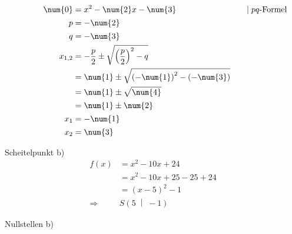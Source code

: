 \begin{exercise}
\begin{minipage}[t]{0.49\linewidth}
        \newcommand{\domod}[1]{\quad&|#1}%
        \begin{alignat*}{3}
          \noeq
          &
          \num{0}&=x^{2}-\num{2}x-\num{3}
          &
          \domod{\;\text{$pq$-Formel}}
          \\
          \noeq
          &
          p&=-\num{2}
          &
          \nomod
          \\
          \noeq
          &
          q&=-\num{3}
          &
          \nomod
          \\
          \noeq
          &
          x_{1,2}&=-\frac{p}{2}\pm\sqrt{\left(\frac{p}{2}\right)^2-q}
          &
          \nomod
          \\
          \noeq
          &
          &=\num{1}\pm\sqrt{\left(-\num{1}\right)^2-\left(-\num{3}\right)}
          &
          \nomod
          \\
          \noeq
          &
          &=\num{1}\pm\sqrt{\num{4}}
          &
          \nomod
          \\
          \noeq
          &
          &=\num{1}\pm\num{2}
          &
          \nomod
          \\
          \noeq
          &
          x_1&=-\num{1}
          &
          \nomod
          \\
          \noeq
          &
          x_2&=\num{3}
          &
          \nomod
        \end{alignat*}
      \endgroup
    \end{minipage}\bigskip\par
    \begin{minipage}[t]{0.49\linewidth}
      Scheitelpunkt b)
      \small
      \begin{equation*}
        \begin{split}
          f(x)&=x^{2}-10x+24
          \\
          &=x^2-10x+25-25+24
          \\
          &=(x-5)^2-1
          \\[1ex]
          \Rightarrow\quad&S\left(5\;\middle|\;-1\right)
        \end{split}
      \end{equation*}
    \end{minipage}%
    \hfill
    \begin{minipage}[t]{0.49\linewidth}
      Nullstellen b)
      \small
      \begingroup
        \newcommand{\vstrut}{\vphantom{\left(f_0^0\right)}}%

\end{minipage}
\end{exercise}

